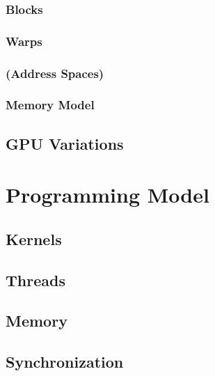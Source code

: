 \documentclass[12px,oz]{report}
\begin{document}
		\subsection{Blocks}
		\label{sec-hw-blocks}
		

		\subsection{Warps}
		\label{sec-hw-warps}
		

		\subsection{(Address Spaces)}

		\subsection{Memory Model}
		\label{sec-hw-memory-model}
		

	\section{GPU Variations}
	\label{sec-hw-variations}
	


\chapter{Programming Model}
\label{ch-programming-model}


	\section{Kernels}
	\label{sec-pm-kernels}
	

	\section{Threads}
	\label{sec-pm-threads}
	
	
	\section{Memory}
	\label{sec-pm-memory}
	
	
	\section{Synchronization}
	\label{sec-pm-synch}
	
	
\end{document}

